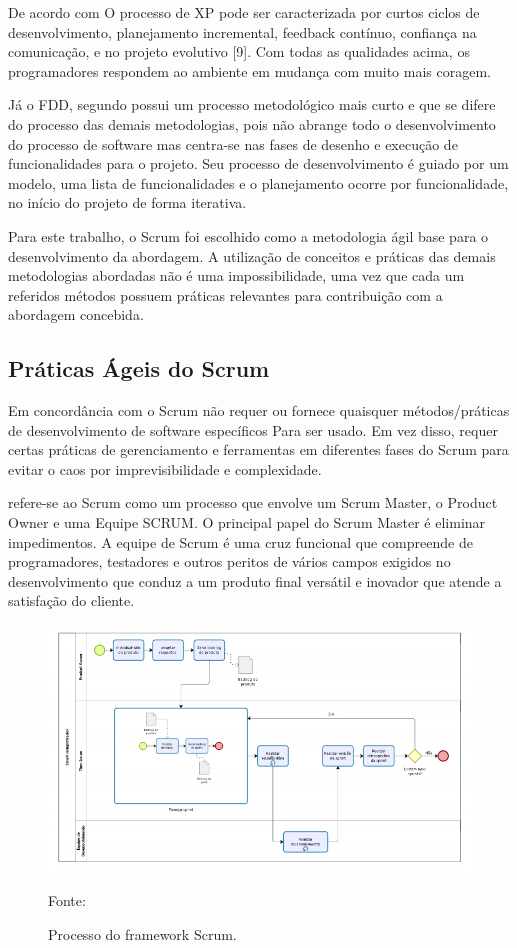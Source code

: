 De acordo com \cite{awad2005comparison} O processo de XP pode ser
caracterizada por curtos ciclos de desenvolvimento, planejamento incremental, feedback contínuo,
confiança na comunicação, e no projeto evolutivo [9]. Com todas as qualidades acima,
os programadores respondem ao ambiente em mudança com muito mais coragem. 

Já o FDD, segundo \cite{awad2005comparison} possui um processo metodológico mais curto e que se difere do processo das demais metodologias, pois não abrange todo o desenvolvimento 
do processo de software mas centra-se nas fases de desenho e execução de funcionalidades para o projeto. Seu processo de desenvolvimento é guiado por um modelo,
uma lista de funcionalidades e o planejamento ocorre por funcionalidade, no início do projeto de forma iterativa.

Para este trabalho, o Scrum foi escolhido como a metodologia ágil base para o desenvolvimento da abordagem. A utilização de conceitos e práticas das demais metodologias abordadas não é uma impossibilidade, uma vez que cada um referidos métodos possuem práticas relevantes para contribuição com a abordagem concebida.

\subsection{Práticas Ágeis do Scrum}

Em concordância com \cite{awad2005comparison} o Scrum não requer ou fornece quaisquer métodos/práticas de desenvolvimento de software específicos
Para ser usado. Em vez disso, requer certas práticas de gerenciamento e ferramentas em diferentes fases
do Scrum para evitar o caos por imprevisibilidade e complexidade.

\cite{srivastava2017scrum} refere-se ao Scrum como um
processo que envolve um Scrum Master, o Product Owner e uma Equipe SCRUM. O principal papel do Scrum Master é eliminar impedimentos. A equipe de Scrum é uma cruz funcional que compreende de programadores, testadores e outros peritos de vários campos exigidos no desenvolvimento que conduz a um produto final versátil e inovador que atende a satisfação do cliente.

\begin{figure}[!htb]
\centering
\label{fig01}
\includegraphics[keepaspectratio=true,scale=0.6]{figuras/processoScrum.png}
\caption{Processo do framework Scrum.}
{Fonte: \cite{cambraiaLeonardo}}
\end{figure}

